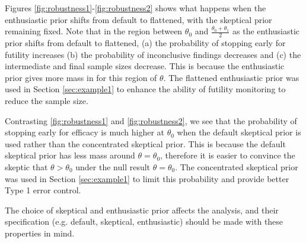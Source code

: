 \documentclass[12pt]{article}
\begin{document}
Figures \ref{fig:robustness1}-\ref{fig:robustness2} shows what happens when the enthusiastic prior shifts from default to flattened, with the skeptical prior remaining fixed. Note that in the region between $\theta_0$ and $\frac{\theta_0+\theta_1}{2}$ as the enthusiastic prior shifts from default to flattened, (a) the probability of stopping early for futility increases (b) the probability of inconclusive findings decreases and (c) the intermediate and final sample sizes decrease. This is because the enthusiastic prior gives more mass in for this region of $\theta$. The flattened enthusiastic prior was used in Section \ref{sec:example1} to enhance the ability of futility monitoring to reduce the sample size.

Contrasting \ref{fig:robustness1} and \ref{fig:robustness2}, we see that the probability of stopping early for efficacy is much higher at $\theta_0$ when the default skeptical prior is used rather than the concentrated skeptical prior. This is because the default skeptical prior has less mass around $\theta=\theta_0$, therefore it is easier to convince the skeptic that $\theta>\theta_0$ under the null result $\theta=\theta_0$. The concentrated skeptical prior was used in Section \ref{sec:example1} to limit this probability and provide better Type 1 error control.

The choice of skeptical and enthusiastic prior affects the analysis, and their specification (e.g. default, skeptical, enthusiastic) should be made with these properties in mind.
\end{document}
